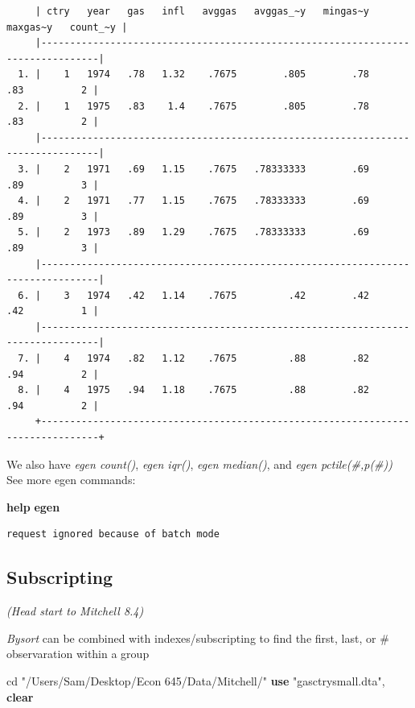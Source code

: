 \documentclass[
]{book}
\newenvironment{Shaded}{\begin{snugshade}}{\end{snugshade}}
\newcommand{\KeywordTok}[1]{\textcolor[rgb]{0.13,0.29,0.53}{\textbf{#1}}}
\newcommand{\NormalTok}[1]{#1}
\newcommand{\StringTok}[1]{\textcolor[rgb]{0.31,0.60,0.02}{#1}}
\begin{document}
\begin{verbatim}
     | ctry   year   gas   infl   avggas   avggas_~y   mingas~y   maxgas~y   count_~y |
     |--------------------------------------------------------------------------------|
  1. |    1   1974   .78   1.32    .7675        .805        .78        .83          2 |
  2. |    1   1975   .83    1.4    .7675        .805        .78        .83          2 |
     |--------------------------------------------------------------------------------|
  3. |    2   1971   .69   1.15    .7675   .78333333        .69        .89          3 |
  4. |    2   1971   .77   1.15    .7675   .78333333        .69        .89          3 |
  5. |    2   1973   .89   1.29    .7675   .78333333        .69        .89          3 |
     |--------------------------------------------------------------------------------|
  6. |    3   1974   .42   1.14    .7675         .42        .42        .42          1 |
     |--------------------------------------------------------------------------------|
  7. |    4   1974   .82   1.12    .7675         .88        .82        .94          2 |
  8. |    4   1975   .94   1.18    .7675         .88        .82        .94          2 |
     +--------------------------------------------------------------------------------+
\end{verbatim}

We also have \emph{egen count()}, \emph{egen iqr()}, \emph{egen median()}, and \emph{egen pctile(\#,p(\#))}
See more egen commands:

\begin{Shaded}
\begin{Highlighting}[]
\KeywordTok{help} \KeywordTok{egen}
\end{Highlighting}
\end{Shaded}

\begin{verbatim}
request ignored because of batch mode
\end{verbatim}

\subsection{Subscripting}\label{subscripting}

\emph{(Head start to Mitchell 8.4)}

\emph{Bysort} can be combined with indexes/subscripting to find the first, last, or \#
observaration within a group

\begin{Shaded}
\begin{Highlighting}[]
\NormalTok{cd }\StringTok{"/Users/Sam/Desktop/Econ 645/Data/Mitchell/"}
\KeywordTok{use} \StringTok{"gasctrysmall.dta"}\NormalTok{, }\KeywordTok{clear}
\end{Highlighting}
\end{Shaded}
\end{document}
